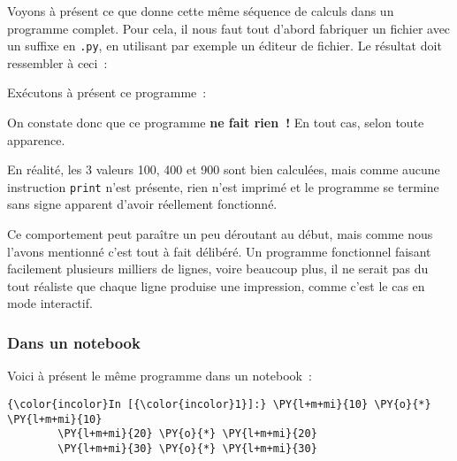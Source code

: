     Voyons à présent ce que donne cette même séquence de calculs dans un
programme complet. Pour cela, il nous faut tout d'abord fabriquer un
fichier avec un suffixe en \texttt{.py}, en utilisant par exemple un
éditeur de fichier. Le résultat doit ressembler à ceci~:

    \begin{Shaded}
\begin{Highlighting}[frame=lines,framerule=0.6mm,rulecolor=\color{asisframecolor}]
\NormalTok{$ }
\NormalTok{$}
\end{Highlighting}
\end{Shaded}

    Exécutons à présent ce programme~:

    \begin{Shaded}
\begin{Highlighting}[frame=lines,framerule=0.6mm,rulecolor=\color{asisframecolor}]
\NormalTok{$ }
\NormalTok{$}
\end{Highlighting}
\end{Shaded}

    On constate donc que ce programme \textbf{ne fait rien~!} En tout cas,
selon toute apparence.

En réalité, les 3 valeurs 100, 400 et 900 sont bien calculées, mais
comme aucune instruction \texttt{print} n'est présente, rien n'est
imprimé et le programme se termine sans signe apparent d'avoir
réellement fonctionné.

Ce comportement peut paraître un peu déroutant au début, mais comme nous
l'avons mentionné c'est tout à fait délibéré. Un programme fonctionnel
faisant facilement plusieurs milliers de lignes, voire beaucoup plus, il
ne serait pas du tout réaliste que chaque ligne produise une impression,
comme c'est le cas en mode interactif.

    \hypertarget{dans-un-notebook}{%
\subsubsection{Dans un notebook}\label{dans-un-notebook}}

    Voici à présent le même programme dans un notebook~:

    \begin{Verbatim}[commandchars=\\\{\},frame=single,framerule=0.3mm,rulecolor=\color{cellframecolor}]
{\color{incolor}In [{\color{incolor}1}]:} \PY{l+m+mi}{10} \PY{o}{*} \PY{l+m+mi}{10}
        \PY{l+m+mi}{20} \PY{o}{*} \PY{l+m+mi}{20}
        \PY{l+m+mi}{30} \PY{o}{*} \PY{l+m+mi}{30}
\end{Verbatim}


